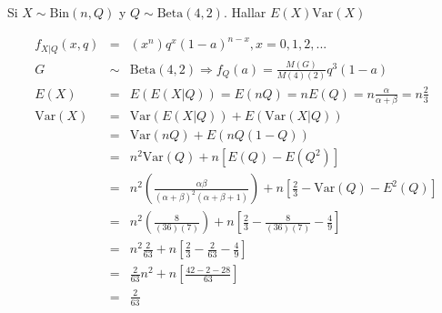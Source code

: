 \begin{Ejem}
Si $X\sim \textrm{Bin} \left(n,Q \right)$ y $Q\sim \textrm{Beta} \left(4,2 \right)$. Hallar $E \left(X \right) \textrm{Var} \left(X \right)$ 

\smallskip

\begin{eqnarray*}
f_{X|Q}\left(x,q \right)&=& \left(x^{n} \right)q^{x}\left(1-a \right)^{n-x}, x=0,1,2,...\\
G &\sim & \textrm{Beta} \left(4,2 \right) \Rightarrow f_{Q}\left(a \right)= \frac{M \left(G \right) }{M \left(4 \right) \left(2 \right)} q^{3} \left(1-a \right)\\
E \left(X \right)&=& E \left(E \left(X|Q\right) \right)= E \left(nQ \right)=n E \left(Q \right)= n \frac{ \alpha }{ \alpha + \beta }  = n \frac{2}{3}\\
\textrm {Var}\left(X \right)&=& \textrm {Var} \left( E \left(X|Q \right) \right)+ E \left( \textrm{Var} \left(X|Q \right) \right)\\
&=&\textrm {Var} \left(nQ \right) + E \left(nQ \left(1-Q \right)  \right)\\
&=& n^{2}  \textrm{Var} \left(Q \right) + n \left[E \left(Q \right)- E \left(Q^2 \right) \right] \\
&=& n^2 \left(\frac{\alpha \beta }{ \left(\alpha + \beta \right)^{2} \left(\alpha + \beta + 1 \right) } \right)
+ n \left[ \frac{2}{3}- \textrm{Var} \left(Q \right) - E^{2}\left(Q \right) \right]\\
&=& n^2 \left( \frac{8}{ \left(36 \right) \left(7 \right) } \right)
+ n \left[\frac{2}{3}-  \frac{8}{ \left(36 \right) \left(7 \right)} - \frac{4}{9} \right]\\
&=& n^2 \frac{2}{63} + n \left[ \frac{2}{3} - \frac{2}{63}- \frac{4}{9} \right]\\
&=&\frac{2}{63} n^2 + n \left[\frac{42-2-28}{63} \right]\\
&=& \frac{2}{63}
\end{eqnarray*}
\end{Ejem}

